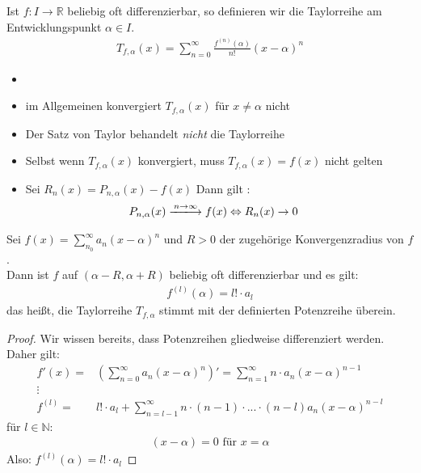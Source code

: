 
\begin{Definition}{
	Ist $f: I \rightarrow \mathbb{R}$ beliebig oft differenzierbar, so definieren 
	wir die Taylorreihe am Entwicklungspunkt $\alpha \in I$.
	\begin{align*}
		T_{f, \alpha} (x) = \sum_{n = 0}^{\infty} \frac{f^{(n)}(\alpha)}{n!}
		(x- \alpha)^n
	\end{align*}
}\end{Definition}

\begin{Bemerkung}{ 
	\begin{itemize}
		\item[ ]
		\item im Allgemeinen konvergiert $T_{f,\alpha}(x)$ für $x \neq \alpha$ nicht
		\item Der Satz von Taylor behandelt \emph{nicht} die Taylorreihe
		\item Selbst wenn $T_{f, \alpha}(x)$ konvergiert, muss 
		$T_{f,\alpha}(x) = f(x)$ nicht gelten
		\item Sei $R_n(x) = P_{n, \alpha}(x) -f(x)$ Dann gilt :
		\begin{align*}
			P_{n,\alpha}(x) \xlongrightarrow{n \rightarrow \infty} f(x) 
			& \Leftrightarrow  R_n (x) \rightarrow 0
		\end{align*}
	\end{itemize}
}\end{Bemerkung}

\begin{Satz}{
	Sei $f(x) = \sum_{n_0}^{\infty} a_n (x- \alpha)^n $ und $R > 0$ der zugehörige 
	Konvergenzradius von $f$.\\
	Dann ist $f$ auf $(\alpha -R, \alpha + R)$ beliebig oft differenzierbar und 
	es gilt:
	\begin{align*}
		f^{(l)}(\alpha) = l ! \cdot a_l
	\end{align*}
	das heißt, die Taylorreihe $T_{f,\alpha}$ stimmt mit der definierten 
	Potenzreihe überein.
}\end{Satz}

\begin{proof}
	Wir wissen bereits, dass Potenzreihen gliedweise differenziert
	 werden. Daher gilt: 
	 \begin{align*}
	 	f'(x) = & \left( \sum_{n = 0}^{\infty} a_n (x- \alpha)^n \right) '
	 	 =  \sum_{n= 1}^{\infty}n \cdot a_n (x- \alpha)^{n-1} \\
	 	\vdots \\
	 	f^{(l)} = & l! \cdot a_l + \sum_{n = l-1}^{\infty} n \cdot (n-1) \cdot 
	 	... \cdot (n-l) a_n(x-\alpha)^{n-l}
	 \end{align*}
	 für $l \in \mathbb{N}$: 
	 \begin{align*}
		 (x - \alpha) = 0 \text{ für } x = \alpha
	 \end{align*}
	 Also: $f^{(l)}(\alpha) = l! \cdot a_l$
\end{proof}
\cleardoublepage
